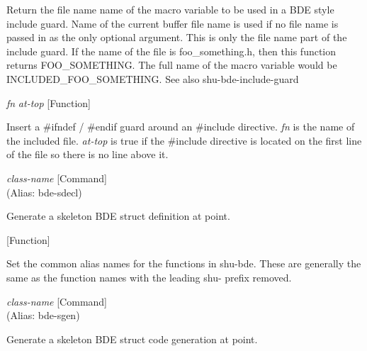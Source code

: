 \begin{doc-string}
Return the file name name of the macro variable to be used in a BDE style include
guard.  Name of the current buffer file name is used if no file name is passed in as
the only optional argument.  This is only the file name part of the include guard.
If the name of the file is foo\_something.h, then this function returns
FOO\_SOMETHING.  The full name of the macro variable would be
INCLUDED\_FOO\_SOMETHING.  See also shu-bde-include-guard
\end{doc-string}

\vspace{1em}
\noindent
{}
\usebox{\funcname}\emph{fn} \emph{at-top}
 \hfill [Function]

\begin{doc-string}
Insert a \#ifndef / \#endif guard around an \#include directive.  \emph{fn} is the name of
the included file.  \emph{at-top} is true if the \#include directive is located on the first
line of the file so there is no line above it.
\end{doc-string}

\vspace{1em}
\noindent
{}
\usebox{\funcname}\emph{class-name}
 \hfill [Command]\\%
 (Alias: bde-sdecl)

\begin{doc-string}
Generate a skeleton BDE struct definition at point.
\end{doc-string}

\vspace{1em}
\noindent
{}
\usebox{\funcname}
 \hfill [Function]

\begin{doc-string}
Set the common alias names for the functions in shu-bde.
These are generally the same as the function names with the leading
shu- prefix removed.
\end{doc-string}

\vspace{1em}
\noindent
{}
\usebox{\funcname}\emph{class-name}
 \hfill [Command]\\%
 (Alias: bde-sgen)

\begin{doc-string}
Generate a skeleton BDE struct code generation at point.
\end{doc-string}

